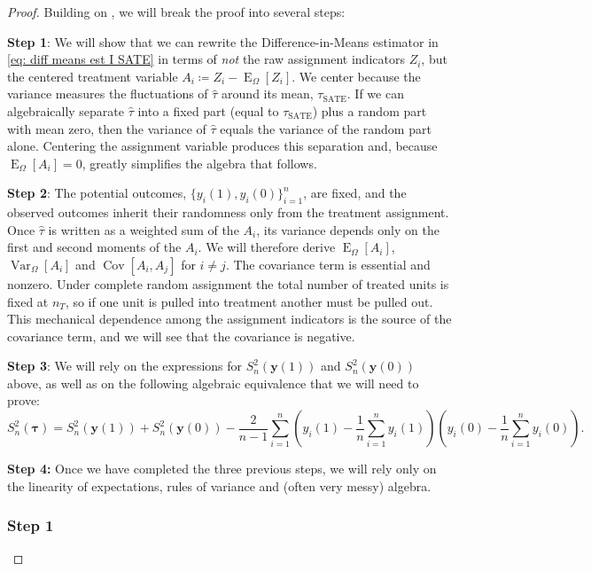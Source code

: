 \documentclass[12pt,leqno]{article}
\theoremstyle{newstyle}
\DeclareMathOperator{\E}{\mathrm{E}}
\DeclareMathOperator{\Var}{\mathrm{Var}}
\DeclareMathOperator{\Cov}{\mathrm{Cov}}
\newcommand{\bZ}{\bm{Z}}   \newcommand{\bz}{\bm{z}}   %
\newcommand{\EZ}{\E_{\Omega}}    \newcommand{\VarZ}{\Var_{\Omega}}  %
\newcommand{\po}[2]{y_{#1}(#2)}     %
\newcommand{\pov}[1]{\bm{y}(#1)}    %
\newcommand{\tauS}{\tau_{\text{SATE}}}
\newcommand{\tauhat}{\hat{\tau}}
\newcommand{\Ssq}[2][n]{S_{#1}^{2}(#2)}
\begin{document}
\begin{proof}
Building on \citet[][Chapter 6, Appendix A]{imbensrubin2015}, we will break the proof into several steps:

\textbf{Step 1}: We will show that we can rewrite the Difference-in-Means estimator in \eqref{eq: diff means est I SATE} in terms of \textit{not} the raw assignment indicators $Z_i$, but the centered treatment variable $A_i \coloneqq Z_i - \EZ[Z_i]$. We center because the variance measures the fluctuations of $\tauhat$ around its mean, $\tauS$. If we can algebraically separate $\tauhat$ into a fixed part (equal to $\tauS$) plus a random part with mean zero, then the variance of $\tauhat$ equals the variance of the random part alone. Centering the assignment variable produces this separation and, because $\EZ[A_i] = 0$, greatly simplifies the algebra that follows.

\textbf{Step 2}: The potential outcomes, $\{\po{i}{1}, \po{i}{0}\}_{i = 1}^n$, are fixed, and the observed outcomes inherit their randomness only from the treatment assignment. Once $\tauhat$ is written as a weighted sum of the $A_i$, its variance depends only on the first and second moments of the $A_i$. We will therefore derive $\EZ[A_i]$, $\VarZ[A_i]$ and $\Cov[A_i, A_j]$ for $i \neq j$. The covariance term is essential and nonzero. Under complete random assignment the total number of treated units is fixed at $n_T$, so if one unit is pulled into treatment another must be pulled out. This mechanical dependence among the assignment indicators is the source of the covariance term, and we will see that the covariance is negative.

\textbf{Step 3}: We will rely on the expressions for $\Ssq{\pov{1}}$ and $\Ssq{\pov{0}}$ above, as well as on the following algebraic equivalence that we will need to prove:
\small
\begin{equation}
\Ssq{\bm{\tau}} = \Ssq{\pov{1}} + \Ssq{\pov{0}} - \dfrac{2}{n - 1} \sum \limits_{i = 1}^n \left(\po{i}{1} - \dfrac{1}{n} \sum \limits_{i = 1}^n \po{i}{1}\right)\left(\po{i}{0} - \dfrac{1}{n} \sum \limits_{i = 1}^n \po{i}{0}\right).
\end{equation}
\normalsize

\textbf{Step 4:} Once we have completed the three previous steps, we will rely only on the linearity of expectations, rules of variance and (often very messy) algebra.

\subsubsection*{Step 1}


\end{proof}
\end{document}
